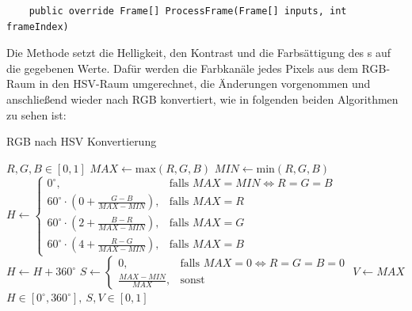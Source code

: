 \begin{itemize}
	\begin{verbatim}
	public override Frame[] ProcessFrame(Frame[] inputs, int frameIndex)
	\end{verbatim}
	Die Methode  setzt die Helligkeit, den Kontrast und die Farbsättigung des s auf die gegebenen Werte. Dafür werden die Farbkanäle jedes Pixels aus dem RGB-Raum in den HSV-Raum umgerechnet, die Änderungen vorgenommen und anschließend wieder nach RGB konvertiert, wie in folgenden beiden Algorithmen zu sehen ist:
	\begin{algorithm}[H]
	\caption{RGB nach HSV Konvertierung}
		\begin{algorithmic}[1]
		\REQUIRE $ R, G, B \in [0, 1] $
		\STATE $ MAX \gets \text{max}(R, G, B) $
		\STATE $ MIN \gets \text{min}(R, G, B) $ 
		\vspace{5px}
		\STATE $
					H \gets
					\begin{cases}
						0^{\circ}, & \text{falls } MAX = MIN \Leftrightarrow R = G = B \\
						60^{\circ}\cdot(0 + \frac{G - B}{MAX - MIN}), & \text{falls } MAX = R \\
						60^{\circ}\cdot(2 + \frac{B - R}{MAX - MIN}), & \text{falls } MAX = G \\
						60^{\circ}\cdot(4 + \frac{R - G}{MAX - MIN}), & \text{falls } MAX = B
					\end{cases}
				$  
				\vspace{5px}
			\STATE $ H \gets H + 360^{\circ} $
		\ENDIF 
		\vspace{5px}
		\STATE $ 
					S \gets
					\begin{cases}
						0, & \text{falls } MAX = 0 \Leftrightarrow R = G = B = 0 \\
						\frac{MAX - MIN}{MAX}, & \text{sonst}
					\end{cases}
				$
		\vspace{5px}
		\STATE $ V \gets MAX $ 
		\ENSURE $ H \in [0^{\circ}, 360^{\circ}],\ S, V \in [0, 1] $
	\end{algorithmic}
	\end{algorithm}
	

\end{itemize}
